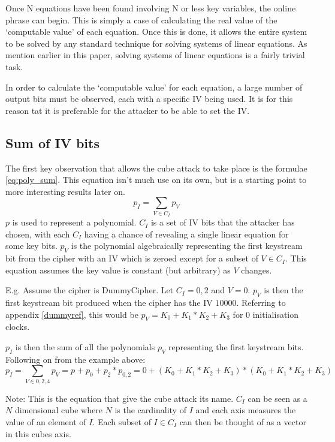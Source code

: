 \documentclass{report}
\let\Oldsubsection\subsection
\renewcommand{\subsection}{\FloatBarrier\Oldsubsection}
\begin{document}
Once N equations have been found involving N or less key variables, the online phrase can begin. This is simply a case of calculating the real value of the `computable value' of each equation. Once this is done, it allows the entire system to be solved by any standard technique for solving systems of linear equations. As mention earlier in this paper, solving systems of linear equations is a fairly trivial task.

In order to calculate the `computable value' for each equation, a large number of output bits must be observed, each with a specific IV being used. It is for this reason tat it is preferable for the attacker to be able to set the IV.

\subsection{Sum of IV bits}
The first key observation that allows the cube attack to take place is the formulae \ref{eq:poly_sum}. This equation isn't much use on its own, but is a starting point to more interesting results later on.
\begin{equation} \label{eq:poly_sum}
p_I = \sum\limits_{V \in C_I} p_V
\end{equation}
$p$ is used to represent a polynomial. $C_I$ is a set of IV bits that the attacker has chosen, with each $C_I$ having a chance of revealing a single linear equation for some key bits.
$p_V$ is the polynomial algebraically representing the first keystream bit from the cipher with an IV which is zeroed except for a subset of $V\in C_I$. This equation assumes the key value is constant (but arbitrary) as $V$ changes.

E.g. Assume the cipher is DummyCipher. Let $C_I = {0,2}$ and $V = {0}$. $p_V$ is then the first keystream bit produced when the cipher has the IV $10000$. Referring to appendix \ref{dummyref}, this would be $p_V = K_0+K_1*K_2+K_3$ for 0 initialisation clocks.

$p_I$ is then the sum of all the polynomials $p_V$ representing the first keystream bits. Following on from the example above:
\begin{equation}\label{eq:poly_sum_eg}
p_I = \sum\limits_{V \in {0,2,4}} p_V  = p_{} + p_{0}+p_2*p_{0,2} = 0+(K_0+K_1*K_2+K_3)*(K_0+K_1*K_2+K_3)
\end{equation}

Note: This is the equation that give the cube attack its name. $C_I$ can be seen as a $N$ dimensional cube where $N$ is the cardinality of $I$ and each axis measures the value of an element of $I$. Each subset of $I \in C_I$ can then be thought of as a vector in this cubes axis.
\end{document}
